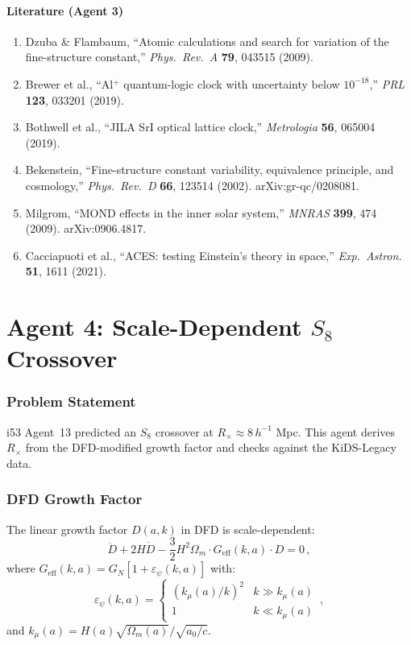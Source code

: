 \documentclass[11pt,a4paper]{article}
\begin{document}
\subsection{Literature (Agent 3)}

\begin{enumerate}
\item Dzuba \& Flambaum, ``Atomic calculations and search for variation of the fine-structure constant,'' \textit{Phys.\ Rev.\ A} \textbf{79}, 043515 (2009).
\item Brewer et al., ``Al$^+$ quantum-logic clock with uncertainty below $10^{-18}$,'' \textit{PRL} \textbf{123}, 033201 (2019).
\item Bothwell et al., ``JILA SrI optical lattice clock,'' \textit{Metrologia} \textbf{56}, 065004 (2019).
\item Bekenstein, ``Fine-structure constant variability, equivalence principle, and cosmology,'' \textit{Phys.\ Rev.\ D} \textbf{66}, 123514 (2002). arXiv:gr-qc/0208081.
\item Milgrom, ``MOND effects in the inner solar system,'' \textit{MNRAS} \textbf{399}, 474 (2009). arXiv:0906.4817.
\item Cacciapuoti et al., ``ACES: testing Einstein's theory in space,'' \textit{Exp.\ Astron.} \textbf{51}, 1611 (2021).
\end{enumerate}


\part{Agent 4: Scale-Dependent $S_8$ Crossover}
\label{part:s8}

\section{Problem Statement}

i53 Agent~13 predicted an $S_8$ crossover at $R_\times \approx 8\,h^{-1}$ Mpc. This agent derives $R_\times$ from the DFD-modified growth factor and checks against the KiDS-Legacy data.

\section{DFD Growth Factor}

The linear growth factor $D(a, k)$ in DFD is scale-dependent:
\begin{equation}
\ddot{D} + 2H\dot{D} - \frac{3}{2}H^2\Omega_m \cdot G_{\mathrm{eff}}(k, a) \cdot D = 0\,,
\end{equation}
where $G_{\mathrm{eff}}(k, a) = G_N[1 + \varepsilon_\psi(k, a)]$ with:
\begin{equation}
\varepsilon_\psi(k, a) = \begin{cases} (k_\mu(a)/k)^2 & k \gg k_\mu(a) \\[4pt] 1 & k \ll k_\mu(a) \end{cases}\,,
\end{equation}
and $k_\mu(a) = H(a)\sqrt{\Omega_m(a)}/\sqrt{a_0/c}$.
\end{document}
